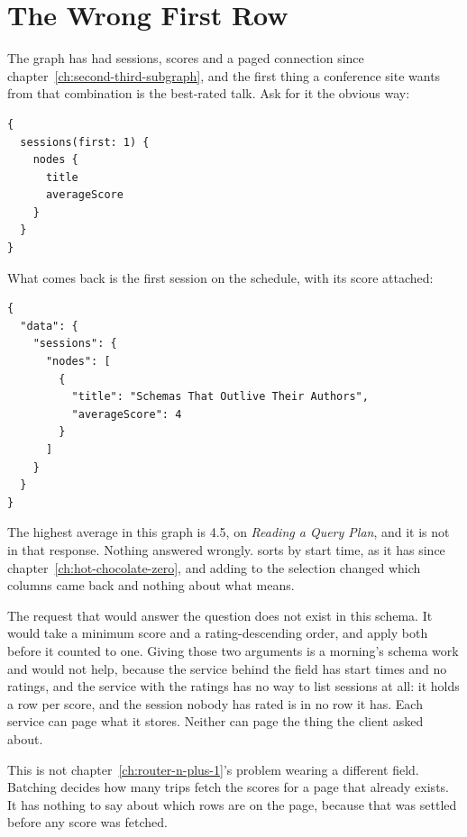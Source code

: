\section{The Wrong First Row}
\label{sec:ch13-wrong-first-row}

%
The graph has had sessions, scores and a paged  connection
since chapter~\ref{ch:second-third-subgraph}, and the first thing a conference
site wants from that combination is the best-rated talk. Ask for it the
obvious way:

\begin{verbatim}
{
  sessions(first: 1) {
    nodes {
      title
      averageScore
    }
  }
}
\end{verbatim}

%
What comes back is the first session on the schedule, with its score attached:

\begin{verbatim}
{
  "data": {
    "sessions": {
      "nodes": [
        {
          "title": "Schemas That Outlive Their Authors",
          "averageScore": 4
        }
      ]
    }
  }
}
\end{verbatim}

The highest average in this graph is 4.5, on \emph{Reading a Query Plan}, and
it is not in that response. Nothing answered wrongly.  sorts by
start time, as it has since chapter~\ref{ch:hot-chocolate-zero}, and adding
 to the selection changed which columns came back and
nothing about what  means.

%
The request that would answer the question does not exist in this schema. It
would take a minimum score and a rating-descending order, and apply both
before it counted to one. Giving  those two arguments is a
morning's schema work and would not help, because the service behind the
field has start times and no ratings, and the service with the ratings has no
way to list sessions at all: it holds a row per score, and the session nobody
has rated is in no row it has. Each service can page what it stores. Neither
can page the thing the client asked about.

%
This is not chapter~\ref{ch:router-n-plus-1}'s problem wearing a different
field. Batching decides how many trips fetch the scores for a page that
already exists. It has nothing to say about which rows are on the page,
because that was settled before any score was fetched.
%
